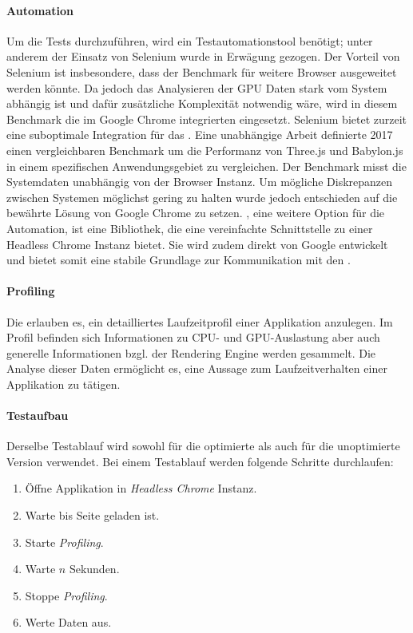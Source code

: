 \paragraph{Automation}
Um die Tests durchzuführen, wird ein Testautomationstool benötigt; unter anderem der Einsatz von Selenium wurde in Erwägung gezogen.
Der Vorteil von Selenium ist insbesondere, dass der Benchmark für weitere Browser ausgeweitet werden könnte.
Da jedoch das Analysieren der GPU Daten stark vom System abhängig ist und dafür zusätzliche Komplexität notwendig wäre, wird in diesem Benchmark die im Google Chrome integrierten  eingesetzt.
Selenium bietet zurzeit eine suboptimale Integration für das .
Eine unabhängige Arbeit definierte 2017 einen vergleichbaren Benchmark um die Performanz von Three.js und Babylon.js in einem spezifischen Anwendungsgebiet zu vergleichen. Der Benchmark misst die Systemdaten unabhängig von der Browser Instanz. \cite{performanceComparisonBabylonThreejs}
Um mögliche Diskrepanzen zwischen Systemen möglichst gering zu halten wurde jedoch entschieden auf die bewährte Lösung von Google Chrome zu setzen.
, eine weitere Option für die Automation, ist eine Bibliothek, die eine vereinfachte Schnittstelle zu einer Headless Chrome Instanz bietet.
Sie wird zudem direkt von Google entwickelt und bietet somit eine stabile Grundlage zur Kommunikation mit den .

\paragraph{Profiling}
Die  erlauben es, ein detailliertes Laufzeitprofil einer Applikation anzulegen.
Im Profil befinden sich Informationen zu CPU- und GPU-Auslastung aber auch generelle Informationen bzgl. der \gls{Rendering Engine} werden gesammelt.
Die Analyse dieser Daten ermöglicht es, eine Aussage zum Laufzeitverhalten einer Applikation zu tätigen.

\paragraph{Testaufbau}
Derselbe Testablauf wird sowohl für die optimierte als auch für die unoptimierte Version verwendet.
Bei einem Testablauf werden folgende Schritte durchlaufen:

\begin{enumerate}
  \item Öffne Applikation in \emph{Headless Chrome} Instanz.
  \item Warte bis Seite geladen ist.
  \item Starte \emph{Profiling}.
  \item Warte $n$ Sekunden.
  \item Stoppe \emph{Profiling}.
  \item Werte Daten aus.
\end{enumerate}

